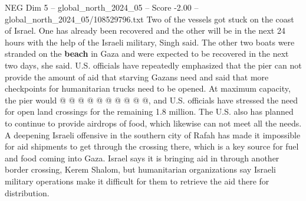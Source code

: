\begin{textsample}{NEG Dim 5 – global\_north\_2024\_05 – Score -2.00 – global\_north\_2024\_05/108529796.txt}
Two of the vessels got stuck on the coast of Israel.
One has already been recovered and the other will be in the next 24 hours with the help of the Israeli military, Singh said.
The other two boats were stranded on the \textbf{beach} in Gaza and were expected to be recovered in the next two days, she said.
U.S. officials have repeatedly emphasized that the pier can not provide the amount of aid that starving Gazans need and said that more checkpoints for humanitarian trucks need to be opened.
At maximum capacity, the pier would @ @ @ @ @ @ @ @ @ @, and U.S. officials have stressed the need for open land crossings for the remaining 1.8 million.
The U.S. also has planned to continue to provide airdrops of food, which likewise can not meet all the needs.
A deepening Israeli offensive in the southern city of Rafah has made it impossible for aid shipments to get through the crossing there, which is a key source for fuel and food coming into Gaza.
Israel says it is bringing aid in through another border crossing, Kerem Shalom, but humanitarian organizations say Israeli military operations make it difficult for them to retrieve the aid there for distribution.

\end{textsample}
